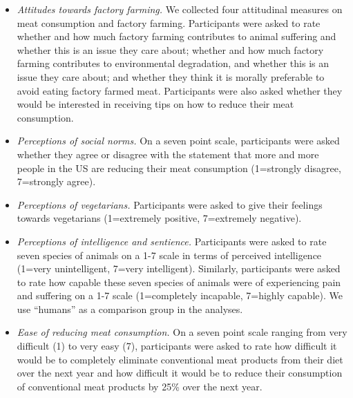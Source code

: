 \documentclass[12pt]{article}
\begin{document}
\begin{itemize}
    \item \textit{Attitudes towards factory farming.} We collected four attitudinal measures on meat consumption and factory farming. Participants were asked to rate whether and how much factory farming contributes to animal suffering and whether this is an issue they care about; whether and how much factory farming contributes to environmental degradation, and whether this is an issue they care about; and whether they think it is morally preferable to avoid eating factory farmed meat. Participants were also asked whether they would be interested in receiving tips on how to reduce their meat consumption.

    \item \textit{Perceptions of social norms.} On a seven point scale, participants were asked whether they agree or disagree with the statement that more and more people in the US are reducing their meat consumption (1=strongly disagree, 7=strongly agree).

    \item \textit{Perceptions of vegetarians.} Participants were asked to give their feelings towards vegetarians (1=extremely positive, 7=extremely negative). 

    \item \textit{Perceptions of intelligence and sentience.} Participants were asked to rate seven species of animals on a 1-7 scale in terms of perceived intelligence (1=very unintelligent, 7=very intelligent). Similarly, participants were asked to rate how capable these seven species of animals were of experiencing pain and suffering on a 1-7 scale (1=completely incapable, 7=highly capable). We use ``humans'' as a comparison group in the analyses.

    \item \textit{Ease of reducing meat consumption.} On a seven point scale ranging from very difficult (1) to very easy (7), participants were asked to rate how difficult it would be to completely eliminate conventional meat products from their diet over the next year and how difficult it would be to reduce their consumption of conventional meat products by 25\% over the next year.
\end{itemize}

\end{document}

